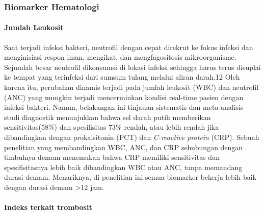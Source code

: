\documentclass[
  10pt,
  letterpaper,
]{article}
\begin{document}
\subsubsection{Biomarker Hematologi}\label{biomarker-hematologi}

\paragraph{Jumlah Leukosit}\label{jumlah-leukosit}

Saat terjadi infeksi bakteri, neutrofil dengan cepat direkrut ke fokus
infeksi dan menginisiasi respon imun, mengikat, dan mengfagositosis
mikroorganisme.\citep{bernardi2024} Sejumlah besar neutrofil dikonsumsi
di lokasi infeksi sehingga harus terus disuplai ke tempat yang
terinfeksi dari sumsum tulang melalui aliran darah.12 Oleh karena itu,
perubahan dinamis terjadi pada jumlah leukosit (WBC) dan neutrofil (ANC)
yang mungkin terjadi mencerminkan kondisi real-time pasien dengan
infeksi bakteri. Namun, belakangan ini tinjauan sistematis dan
meta-analisis studi diagnostik menunjukkan bahwa sel darah putih
memberikan sensitivitas(58\%) dan spesifisitas 73\% rendah, atau lebih
rendah jika dibandingkan dengan prokalsitonin (PCT) dan \emph{C-reactive
protein} (CRP).\citep{Yo2012} Sebuah penelitian yang membandingkan WBC,
ANC, dan CRP sehubungan dengan timbulnya demam menemukan bahwa CRP
memiliki sensitivitas dan spesifisitasnya lebih baik dibandingkan WBC
atau ANC, tanpa memandang durasi demam. Menariknya, di penelitian ini
semua biomarker bekerja lebih baik dengan durasi demam \textgreater12
jam.\citep{pratt2007}

\paragraph{Indeks terkait trombosit}\label{indeks-terkait-trombosit}
\end{document}
